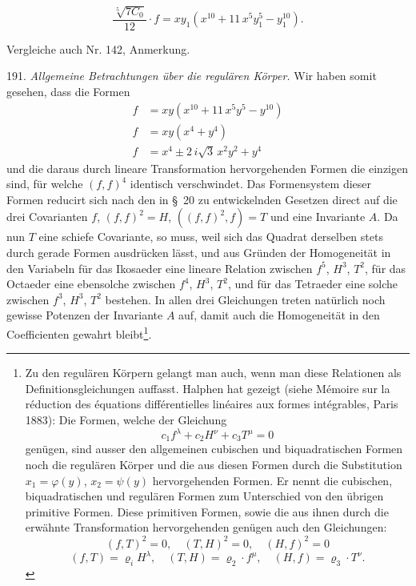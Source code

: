 \documentclass[11pt]{article}
\providecommand{\weberpage}[1]{}
\providecommand{\weq}[2]{\begin{equation}\tag{#1}#2\end{equation}}
\begin{document}
\weberpage{213}
\[
\frac{\sqrt[5]{7C_0}}{12}\cdot f = xy_1(x^{10}+11\,x^5y_1^{5}-y_1^{10}).
\]

Vergleiche auch Nr. 142, Anmerkung.

191. \textit{Allgemeine Betrachtungen über die regulären Körper.} Wir haben somit gesehen, dass die Formen
\[
\begin{aligned}
f &= xy(x^{10}+11\,x^5y^5-y^{10})\\
f &= xy(x^4+y^4)\\
f &= x^4 \pm 2\,i\sqrt{3}\,x^2y^2+y^4
\end{aligned}
\]
und die daraus durch lineare Transformation hervorgehenden Formen die einzigen sind, für welche $(f,f)^4$ identisch verschwindet. Das Formensystem dieser Formen reducirt sich nach den in \S~20 zu entwickelnden Gesetzen direct auf die drei Covarianten $f$, $(f,f)^2=H$, $((f,f)^2,f)=T$ und eine Invariante $A$. Da nun $T$ eine schiefe Covariante, so muss, weil sich das Quadrat derselben stets durch gerade Formen ausdrücken lässt, und aus Gründen der Homogeneität in den Variabeln für das Ikosaeder eine lineare Relation zwischen $f^5$, $H^3$, $T^2$, für das Octaeder eine ebensolche zwischen $f^4$, $H^3$, $T^2$, und für das Tetraeder eine solche zwischen $f^3$, $H^3$, $T^2$ bestehen. In allen drei Gleichungen treten natürlich noch gewisse Potenzen der Invariante $A$ auf, damit auch die Homogeneität in den Coefficienten gewahrt bleibt\footnote{Zu den regulären Körpern gelangt man auch, wenn man diese Relationen als Definitionsgleichungen auffasst. Halphen hat gezeigt (siehe \glqq Mémoire sur la réduction des équations différentielles linéaires aux formes intégrables\grqq{}, Paris 1883): Die Formen, welche der Gleichung
\[
c_1f^{\lambda}+c_2H^{\nu}+c_3T^{\mu}=0
\]
genügen, sind ausser den allgemeinen cubischen und biquadratischen Formen noch die regulären Körper und die aus diesen Formen durch die Substitution $x_1=\varphi(y)$, $x_2=\psi(y)$ hervorgehenden Formen. Er nennt die cubischen, biquadratischen und regulären Formen zum Unterschied von den übrigen \glqq primitive Formen\grqq{}. Diese primitiven Formen, sowie die aus ihnen durch die erwähnte Transformation hervorgehenden genügen auch den Gleichungen:
\weq{I}{(f,T)^2=0,\quad (T,H)^2=0,\quad (H,f)^2=0}
\weq{II}{(f,T)=\varrho_i H^{\lambda},\quad (T,H)=\varrho_2\cdot f^{\mu},\quad (H,f)=\varrho_3\cdot T^{\nu}.} %
}.
\end{document}
